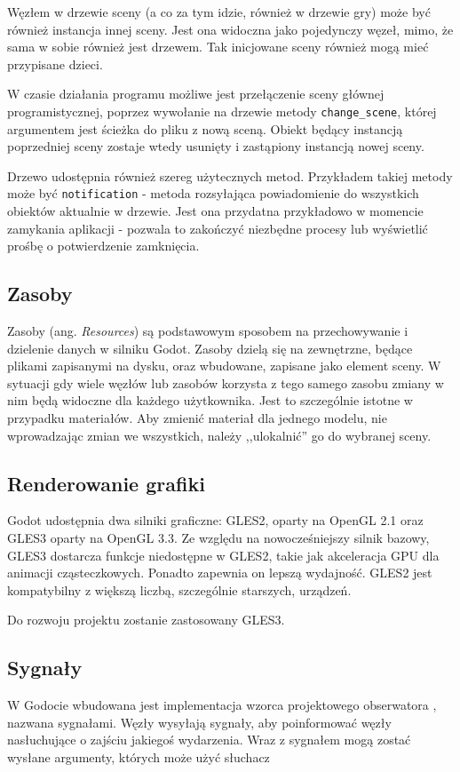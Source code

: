 Węzłem w drzewie sceny (a co za tym idzie, również w drzewie gry) może być również instancja innej sceny. Jest ona widoczna jako pojedynczy węzeł, mimo, że sama w sobie również jest drzewem. Tak inicjowane sceny również mogą mieć przypisane dzieci.

W czasie działania programu możliwe jest przełączenie sceny głównej programistycznej, poprzez wywołanie na drzewie metody \texttt{change\_scene}, której argumentem jest ścieżka do pliku z nową sceną. Obiekt będący instancją poprzedniej sceny zostaje wtedy usunięty i zastąpiony instancją nowej sceny.

Drzewo udostępnia również szereg użytecznych metod. Przykładem takiej metody może być \texttt{notification} - metoda rozsyłająca powiadomienie do wszystkich obiektów aktualnie w drzewie. Jest ona przydatna przykładowo w momencie zamykania aplikacji - pozwala to zakończyć niezbędne procesy lub wyświetlić prośbę o potwierdzenie zamknięcia.

\subsection{Zasoby}
Zasoby (ang. \emph{Resources}) są podstawowym sposobem na przechowywanie i dzielenie danych w silniku Godot. Zasoby dzielą się na zewnętrzne, będące plikami zapisanymi na dysku, oraz wbudowane, zapisane jako element sceny. W sytuacji gdy wiele węzłów lub zasobów korzysta z tego samego zasobu zmiany w nim będą widoczne dla każdego użytkownika. Jest to szczególnie istotne w przypadku materiałów. Aby zmienić materiał dla jednego modelu, nie wprowadzając zmian we wszystkich, należy ,,ulokalnić'' go do wybranej sceny. 

\subsection{Renderowanie grafiki}
Godot udostępnia dwa silniki graficzne: GLES2, oparty na OpenGL 2.1 oraz GLES3 oparty na OpenGL 3.3. Ze względu na nowocześniejszy silnik bazowy, GLES3 dostarcza funkcje niedostępne w GLES2, takie jak akceleracja GPU dla animacji cząsteczkowych. Ponadto zapewnia on lepszą wydajność. GLES2 jest kompatybilny z większą liczbą, szczególnie starszych, urządzeń.

Do rozwoju projektu zostanie zastosowany GLES3.

\subsection{Sygnały}
W Godocie wbudowana jest implementacja wzorca projektowego obserwatora \cite{game_programming_patterns}, nazwana sygnałami. Węzły wysyłają sygnały, aby poinformować węzły nasłuchujące o zajściu jakiegoś wydarzenia. Wraz z sygnałem mogą zostać wysłane argumenty, których może użyć słuchacz

